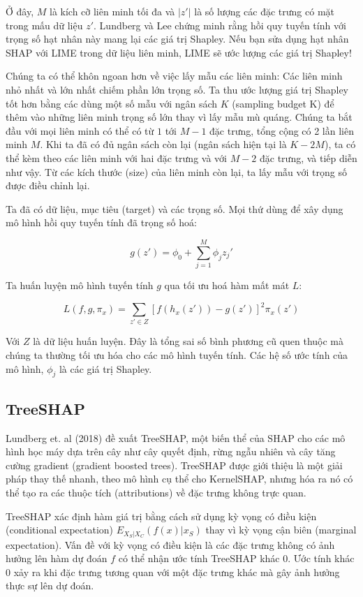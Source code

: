 \begin{enumerate}
Ở đây, $M$ là kích cỡ liên minh tối đa và $|z'|$ là số lượng các đặc trưng có mặt trong mấu dữ liệu $z'$. Lundberg và Lee chứng minh rằng hồi quy tuyến tính với trọng số hạt nhân này mang lại các giá trị Shapley. Nếu bạn sửa dụng hạt nhân SHAP với LIME trong dữ liệu liên minh, LIME sẽ ước lượng các giá trị Shapley!  


Chúng ta có thể khôn ngoan hơn về việc lấy mẫu các liên minh: Các liên minh nhỏ nhất và lớn nhất chiếm phần lớn trọng số. Ta thu ước lượng giá trị Shapley tốt hơn bằng các dùng một số mẫu với ngân sách $K$ (sampling budget K) để thêm vào những liên minh trọng số lớn thay vì lấy mẫu mù quáng. Chúng ta bắt đầu với mọi liên minh có thể có từ $1$ tới $M-1$ đặc trưng, tổng cộng có 2 lần liên minh $M$. Khi ta đã có đủ ngân sách còn lại (ngân sách hiện tại là $K-2M$), ta có thể kèm theo các liên minh với hai đặc trưng và với $M-2$ đặc trưng, và tiếp diễn như vậy. Từ các kích thước (size) của liên minh còn lại, ta lấy mẫu với trọng số được điều chỉnh lại.

Ta đã có dữ liệu, mục tiêu (target) và các trọng số. Mọi thứ dùng để xây dụng mô hình hồi quy tuyến tính đã trọng số hoá:

$$g(z')=\phi_0+\sum_{j=1}^M\phi_jz_j'$$

Ta huấn luyện mô hình tuyến tính $g$ qua tối ưu hoá hàm mất mát $L$: 

$$L(f,g,\pi_{x})=\sum_{z'\in{}Z}[f(h_x(z'))-g(z')]^2\pi_{x}(z')$$

Với $Z$ là dữ liệu huấn luyện. Đây là tổng sai số bình phương cũ quen thuộc mà chúng ta thường tối ưu hóa cho các mô hình tuyến tính. Các hệ số ước tính của mô hình, $\phi_j$ là các giá trị Shapley.


\subsection{TreeSHAP}

Lundberg et. al (2018) đề xuất TreeSHAP, một biến thể của SHAP cho các mô hình học máy dựa trên cây như cây quyết định, rừng ngẫu nhiên và cây tăng cường gradient (gradient boosted trees). TreeSHAP được giới thiệu là một giải pháp thay thế nhanh, theo mô hình cụ thể cho KernelSHAP, nhưng hóa ra nó có thể tạo ra các thuộc tích (attributions) về đặc trưng không trực quan.

TreeSHAP xác định hàm giá trị bằng cách sử dụng kỳ vọng có điều kiện (conditional expectation) $ E_{X_S|X_C}(f(x)|x_S)$ thay vì kỳ vọng cận biên (marginal expectation). Vấn đề với kỳ vọng có điều kiện là các đặc trưng không có ảnh hưởng lên hàm dự đoán $f$ có thể nhận ước tính TreeSHAP khác 0. Ước tính khác $0$ xảy ra khi đặc trưng tương quan với một đặc trưng khác mà gây ảnh hưởng thực sự lên dự đoán.    



\end{enumerate}
